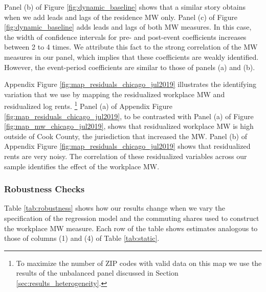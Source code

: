 Panel (b) of Figure \ref{fig:dynamic_baseline} shows that a similar story 
obtains when we add leads and lags of the residence MW only.
Panel (c) of Figure \ref{fig:dynamic_baseline} adds leads and lags of both MW 
measures.
In this case, the width of confidence intervals for pre- and post-event 
coefficients increases between 2 to 4 times.
We attribute this fact to the strong correlation of the MW measures in our
panel, which implies that these coefficients are weakly identified.
However, the event-period coefficients are similar to those of 
panels (a) and (b).

Appendix Figure \ref{fig:map_residuals_chicago_jul2019} illustrates the 
identifying variation that we use by mapping the residualized workplace MW and 
residualized log rents.%
\footnote{To maximize the number of ZIP codes with valid data on this map we
use the results of the unbalanced panel discussed in Section 
\ref{sec:results_heterogeneity}.}
Panel (a) of Appendix Figure \ref{fig:map_residuals_chicago_jul2019}, to be 
contrasted with Panel (a) of Figure \ref{fig:map_mw_chicago_jul2019}, 
shows that residualized workplace MW is high outside of Cook County, the 
jurisdiction that increased the MW.
Panel (b) of Appendix Figure \ref{fig:map_residuals_chicago_jul2019} shows 
that residualized rents are very noisy.
The correlation of these residualized variables across our sample identifies
the effect of the workplace MW.

\subsubsection*{Robustness Checks}

Table \ref{tab:robustness} shows how our results change when we vary the
specification of the regression model and the commuting shares used 
to construct the workplace MW measure.
Each row of the table shows estimates analogous to those of columns (1) and (4)
of Table \ref{tab:static}.

